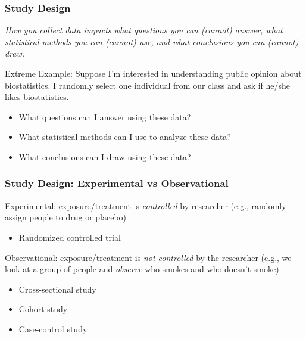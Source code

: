 \documentclass[12pt, 
hyperref={colorlinks=true, linkcolor=blue, urlcolor=cyan}]{beamer}
\begin{document}
\begin{frame}
\frametitle{Study Design}
\textit{How you collect data impacts what questions you can (cannot) answer, what statistical methods you can (cannot) use, and what conclusions you can (cannot) draw.}

\color{blue} Extreme Example: \color{black} Suppose I'm interested in understanding public opinion about biostatistics. I  randomly select one individual from our class and ask if he/she likes biostatistics. \vspace{-0.3cm}

\begin{itemize} %
\item What questions can I answer using these data? 
\item What statistical methods can I use to analyze these data? 
\item What conclusions can I draw using these data? 
\end{itemize} 

\end{frame}

\begin{frame}
\frametitle{Study Design: Experimental vs Observational}

\color{blue} Experimental: \color{black} exposure/treatment is \textit{controlled} by researcher (e.g., randomly assign people to drug or placebo) \vspace{-0.3cm}
	\begin{itemize}
	\item Randomized controlled trial %
	\end{itemize}

\color{blue} Observational: \color{black} exposure/treatment is \textit{not controlled} by the researcher (e.g., we look at a group of people and \textit{observe} who smokes and who doesn't smoke)  \vspace{-0.3cm}
	\begin{itemize}
	\item Cross-sectional study
	\item Cohort study
	\item Case-control study
	\end{itemize}
\end{frame}
\end{document}
